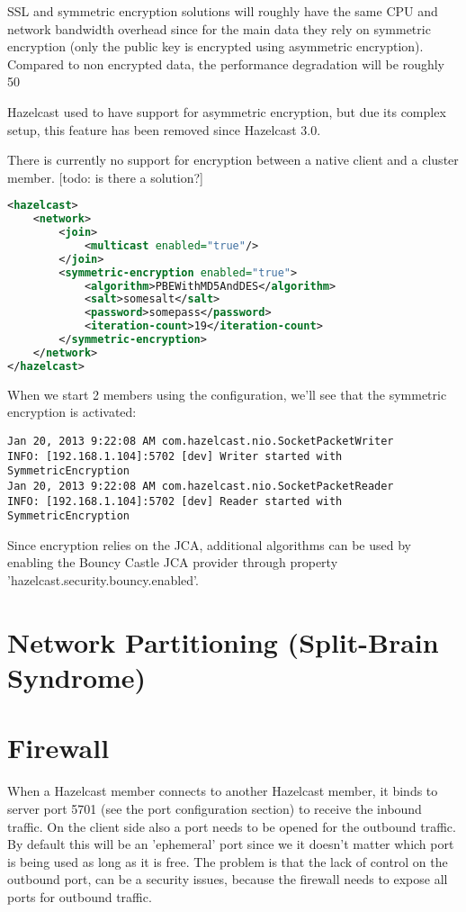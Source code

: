 SSL and symmetric encryption solutions will roughly have the same CPU and network bandwidth overhead since for the main data  they rely on symmetric encryption (only the public key is encrypted using asymmetric encryption). Compared to non encrypted data, the performance degradation will be roughly 50%

Hazelcast used to have support for asymmetric encryption, but due its complex setup, this feature has been removed since Hazelcast 3.0. 

There is currently no support for encryption between a native client and a cluster member. [todo: is there a solution?]

\begin{lstlisting}[language=xml]
<hazelcast>
    <network>
        <join>
            <multicast enabled="true"/>
        </join>
        <symmetric-encryption enabled="true">
            <algorithm>PBEWithMD5AndDES</algorithm>
            <salt>somesalt</salt>
            <password>somepass</password>
            <iteration-count>19</iteration-count>
        </symmetric-encryption>
    </network>
</hazelcast>
\end{lstlisting}
When we start 2 members using the configuration, we'll see that the symmetric encryption is activated:
\begin{lstlisting}
Jan 20, 2013 9:22:08 AM com.hazelcast.nio.SocketPacketWriter
INFO: [192.168.1.104]:5702 [dev] Writer started with SymmetricEncryption
Jan 20, 2013 9:22:08 AM com.hazelcast.nio.SocketPacketReader
INFO: [192.168.1.104]:5702 [dev] Reader started with SymmetricEncryption
\end{lstlisting}
Since encryption relies on the JCA, additional algorithms can be used by enabling the Bouncy Castle JCA provider through property 'hazelcast.security.bouncy.enabled'.

\section{Network Partitioning (Split-Brain Syndrome)}

\section{Firewall}
When a Hazelcast member connects to another Hazelcast member, it binds to server port 5701 (see the port configuration section) to receive the inbound traffic. On the client side also a port needs to be opened for the outbound traffic. By default this will be an 'ephemeral' port since we it doesn't matter which port is being used as long as it is free. The problem is that the lack of control on the outbound port, can be a security issues, because the firewall needs to expose all ports for outbound traffic. 

